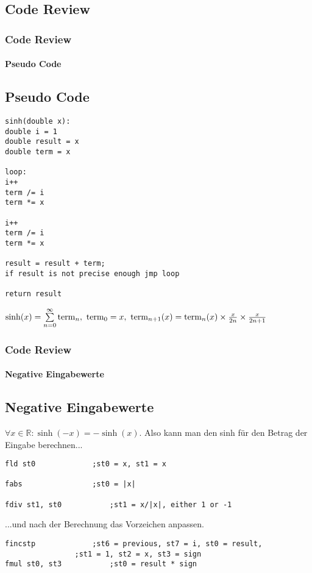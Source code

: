 	\begin{frame}[fragile]
		\section{Code Review}
		\frametitle{Code Review}
		\framesubtitle{Pseudo Code}
		\subsection{Pseudo Code}
\begin{lstlisting}[style=myPseudo, title=Sinh in Pseudocode]
sinh(double x):
double i = 1
double result = x
double term = x

loop:
i++
term /= i
term *= x

i++
term /= i
term *= x

result = result + term;
if result is not precise enough jmp loop

return result
\end{lstlisting}
$\sinh(x) = \sum\limits_{n=0}^{\infty} \operatorname{term}_{n}, \ \operatorname{term}_{0} = x, \ \operatorname{term}_{n+1}(x) = \operatorname{term}_{n}(x) \times \frac{x}{2n} \times \frac{x}{2n+1}$
\end{frame}
\begin{frame}[fragile]
\frametitle{Code Review}
\framesubtitle{Negative Eingabewerte}
\subsection{Negative Eingabewerte}
$\forall x \in \mathbb{R}: \sinh(-x) = -\sinh(x)$. Also kann man den sinh für den Betrag der Eingabe berechnen...
\begin{lstlisting}[style=myAssembly, title=sinh.asm vor Aufruf der Hauptschleife, firstnumber = 22]
fld st0				;st0 = x, st1 = x

fabs				;st0 = |x|

fdiv st1, st0			;st1 = x/|x|, either 1 or -1
\end{lstlisting}
...und nach der Berechnung das Vorzeichen anpassen.
\begin{lstlisting}[style=myAssembly, title=sinh.asm nach Verlassen der Hauptschleife, firstnumber = 83]
fincstp				;st6 = previous, st7 = i, st0 = result, 
				;st1 = 1, st2 = x, st3 = sign
fmul st0, st3			;st0 = result * sign
\end{lstlisting}
\end{frame}
